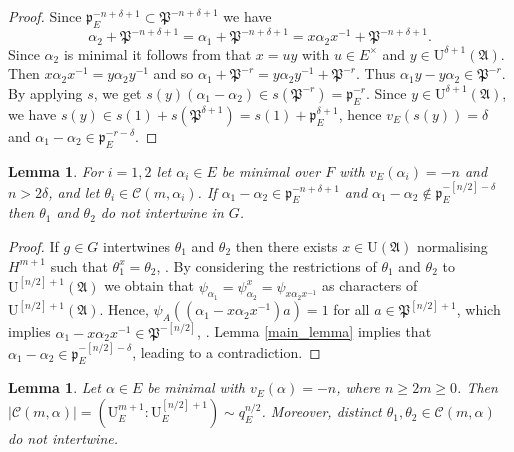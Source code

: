 \documentclass[11pt]{article}
\let\mathcal\mathscr
\newtheorem{lem}[prop]{Lemma}
\theoremstyle{definition}
\newcommand{\Aa}{\mathfrak A}
\newcommand{\Pp}{\mathfrak P}
\newcommand{\pp}{\mathfrak p}
\newcommand{\UU}{\mathrm U}
\begin{document}
\begin{proof} Since $\pp^{-n+\delta+1}_E\subset \Pp^{-n+\delta+1}$ we have
\[
\alpha_2+ \Pp^{-n+\delta+1} = \alpha_1 + \Pp^{-n+\delta+1}=x \alpha_2 x^{-1}+ \Pp^{-n+\delta+1}.
\]
Since $\alpha_2$ is minimal it follows from \cite[Th.\,2.4]{KM} that $x= u y$ with $u\in E^{\times}$ and $y\in \UU^{\delta+1}(\Aa)$. Then
$x \alpha_2 x^{-1}= y\alpha_2 y^{-1}$ and so
$ \alpha_1+ \Pp^{-r}= y \alpha_2 y^{-1} +\Pp^{-r}$. Thus $\alpha_1 y - y \alpha_2 \in \Pp^{-r}$. By applying $s$, we get
$s(y)( \alpha_1 - \alpha_2)\in s(\Pp^{-r})= \pp_E^{-r}$. Since $y\in \UU^{\delta+1}(\Aa)$, we have $s(y)\in s(1)+s(\Pp^{\delta+1})= s(1)+ \pp_E^{\delta+1}$, hence
$v_E(s(y))= \delta$ and $\alpha_1 - \alpha_2\in \pp_E^{-r-\delta}$.
\end{proof}

\begin{lem}\label{notinter} For $i=1, 2$ let $\alpha_i\in E$ be minimal over $F$ with $v_E(\alpha_i)=-n$ and $n> 2\delta$, and let $\theta_i\in \mathcal C(m, \alpha_i)$.
If $\alpha_1- \alpha_2\in \pp_E^{-n+\delta +1}$ and $\alpha_1-\alpha_2 \not\in \pp_E^{-[n/2]-\delta}$ then $\theta_1$ and $\theta_2$ do not intertwine in $G$.
\end{lem}

\begin{proof} If $g\in G$ intertwines $\theta_1$ and $\theta_2$ then there exists $x\in \UU(\Aa)$ normalising $H^{m+1}$ such that $\theta_1^x= \theta_2$, \cite[(3.5.11)]{BK}.
By considering the restrictions of $\theta_1$ and $\theta_2$ to $\UU^{[n/2]+1}(\Aa)$ we obtain that $\psi_{\alpha_1}= \psi^x_{\alpha_2}= \psi_{x \alpha_2 x^{-1}}$ as
characters of $\UU^{[n/2]+1}(\Aa)$. Hence, $\psi_A((\alpha_1 - x \alpha_2 x^{-1}) a)=1$ for all $a\in \Pp^{[n/2]+1}$, which implies $\alpha_1- x \alpha_2 x^{-1}\in \Pp^{-[n/2]}$,
\cite[p.\,22]{BK}. Lemma \ref{main_lemma} implies that $\alpha_1-\alpha_2 \in \pp_E^{-[n/2]-\delta}$, leading to a contradiction.
\end{proof}

\begin{lem}\label{single_alpha} Let $\alpha\in E$ be minimal with $v_E(\alpha)=-n$, where $n\ge 2m\ge 0$. Then $|\mathcal C(m, \alpha)| = (\UU^{m+1}_E : \UU^{[n/2]+1}_E)\sim q_E^{n/2}$.
Moreover, distinct $\theta_1, \theta_2\in \mathcal C(m, \alpha)$ do not intertwine.
\end{lem}
\end{document}
